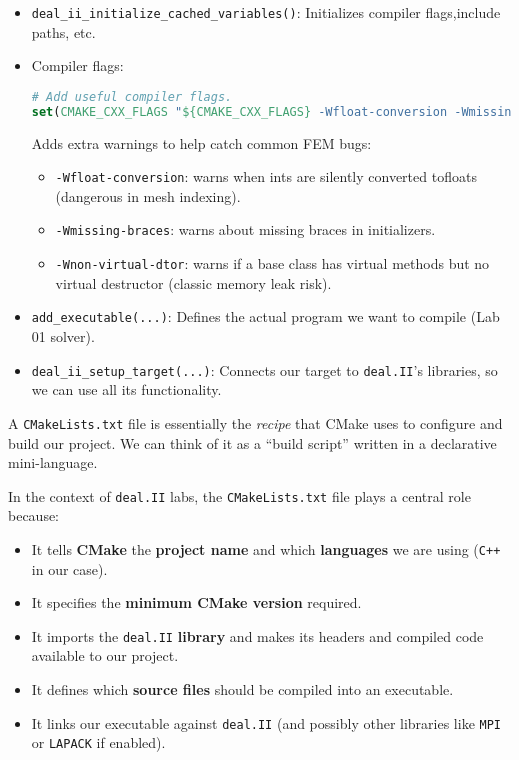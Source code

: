 \begin{itemize}
    
    \item \texttt{deal\_ii\_initialize\_cached\_variables()}: Initializes compiler flags,\break include paths, etc.
    

    \item Compiler flags:
    \begin{lstlisting}[language=CMake]
# Add useful compiler flags.
set(CMAKE_CXX_FLAGS "${CMAKE_CXX_FLAGS} -Wfloat-conversion -Wmissing-braces -Wnon-virtual-dtor")\end{lstlisting}
    Adds extra warnings to help catch common FEM bugs:
    \begin{itemize}
        \item \texttt{-Wfloat-conversion}: warns when ints are silently converted to\break floats (dangerous in mesh indexing).
        \item \texttt{-Wmissing-braces}: warns about missing braces in initializers.
        \item \texttt{-Wnon-virtual-dtor}: warns if a base class has virtual methods but no virtual destructor (classic memory leak risk).
    \end{itemize}
    
    
    \item \texttt{add\_executable(...)}: Defines the actual program we want to compile (Lab 01 solver).
    
    
    \item \texttt{deal\_ii\_setup\_target(...)}: Connects our target to \texttt{deal.II}'s libraries, so we can use all its functionality.
\end{itemize}

\begin{remarkbox}
    A \texttt{CMakeLists.txt} file is essentially the \emph{recipe} that CMake uses to configure and build our project. We can think of it as a ``build script'' written in a declarative mini-language.

    \highspace
    In the context of \texttt{deal.II} labs, the \texttt{CMakeLists.txt} file plays a central role because:
    \begin{itemize}
        \item It tells \textbf{CMake} the \textbf{project name} and which \textbf{languages} we are using (\texttt{C++} in our case).
        \item It specifies the \textbf{minimum CMake version} required.
        \item It imports the \texttt{deal.II} \textbf{library} and makes its headers and compiled code available to our project.
        \item It defines which \textbf{source files} should be compiled into an executable.
        \item It links our executable against \texttt{deal.II} (and possibly other libraries like \texttt{MPI} or \texttt{LAPACK} if enabled).
    \end{itemize}
\end{remarkbox}